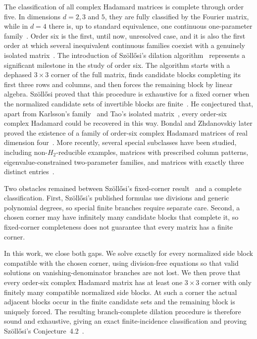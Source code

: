 \documentclass[aps,prx,reprint,nofootinbib,twoside,superscriptaddress,longbibliography,floatfix]{revtex4-2}
\theoremstyle{definition}
\begin{document}
The classification of all complex Hadamard matrices is complete through order five. In dimensions $d=2,3$ and $5$, they are fully classified by the Fourier matrix, while in $d=4$ there is, up to standard equivalence, one continuous one-parameter family~\cite{Haagerup1997,TadejZyczkowski2006}.
Order six is the first, until now, unresolved case, and it is also the first order at which several inequivalent continuous families coexist with a genuinely isolated matrix~\cite{TadejZyczkowski2006,Szollosi2012FourParameter,BengtssonEtAl2007,Tadej2008}. The introduction of Sz\"oll\H{o}si's dilation algorithm~\cite{Szollosi2012FourParameter} represents a significant milestone in the study of order six. The algorithm starts with a dephased $3\times3$ corner of the full matrix, finds candidate blocks completing its first three rows and columns, and then forces the remaining block by linear algebra. Sz\"oll\H{o}si proved that this procedure is exhaustive for a fixed corner when the normalized candidate sets of invertible blocks are finite~\cite{Szollosi2012FourParameter}. He conjectured that, apart from Karlsson's family~\cite{Karlsson2011H2,Karlsson2011ThreeParameter} and Tao's isolated 
matrix~\cite{Tao2004,BengtssonEtAl2007,Tadej2008}, every order-six complex Hadamard could be recovered in this way. 
Bondal and Zhdanovskiy later proved the existence of a family of order-six complex Hadamard matrices of real dimension four~\cite{BondalZhdanovskiy2016}. More recently, several special subclasses have been studied, including non-$H_2$-reducible examples, matrices with prescribed column patterns, eigenvalue-constrained two-parameter families, and matrices with exactly three distinct entries~\cite{LiangEtAl2024,MatszangoszSzollosi2024,HuangChen2026Eigenvalues,HuangLiangChen2026ThreeElements}.
%


Two obstacles remained between Sz\"oll\H{o}si's fixed-corner result~\cite{Szollosi2012FourParameter} and a complete classification.
First, Sz\"oll\H{o}si's published formulas use divisions and generic polynomial degrees, so special finite branches require separate care.
Second, a chosen corner may have infinitely many candidate blocks that complete it, so fixed-corner completeness does not guarantee that every matrix has a finite corner.

In this work, we close both gaps. We solve exactly for every normalized side block compatible with the chosen corner, using division-free equations so that valid solutions on vanishing-denominator branches are not lost. We then prove that every order-six complex Hadamard matrix has at least one $3\times3$ corner with only finitely many compatible normalized side blocks. At such a corner the actual adjacent blocks occur in the finite candidate sets and the remaining block is uniquely forced. The resulting branch-complete dilation procedure is therefore sound and exhaustive, giving an exact finite-incidence classification and proving Sz\"oll\H{o}si's Conjecture~4.2~\cite{Szollosi2012FourParameter}.
\end{document}
